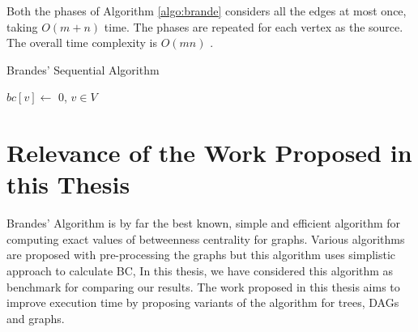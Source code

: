 Both the phases of Algorithm \ref{algo:brande} considers all the edges at most once, taking $O(m + n)$ time. The phases are repeated for each vertex as the source. The overall time complexity is $O(mn)$ \cite{doi:10.1080/0022250X.2001.9990249}.

\begin{algorithm}
\caption{Brandes' Sequential Algorithm}
\label{algo:brande}

$bc[v] \leftarrow$ 0, $v \in V$\;
\end{algorithm}
\vspace{-1.0em}
\section{Relevance of the Work Proposed in this Thesis}
Brandes' Algorithm is by far the best known, simple and efficient algorithm for computing exact values of betweenness centrality for graphs. Various algorithms are proposed with pre-processing the graphs but this algorithm uses simplistic approach to calculate BC, In this thesis, we have considered this algorithm as benchmark for comparing our results. 
The work proposed in this thesis aims to improve execution time by proposing variants of the algorithm for trees, DAGs and graphs.


